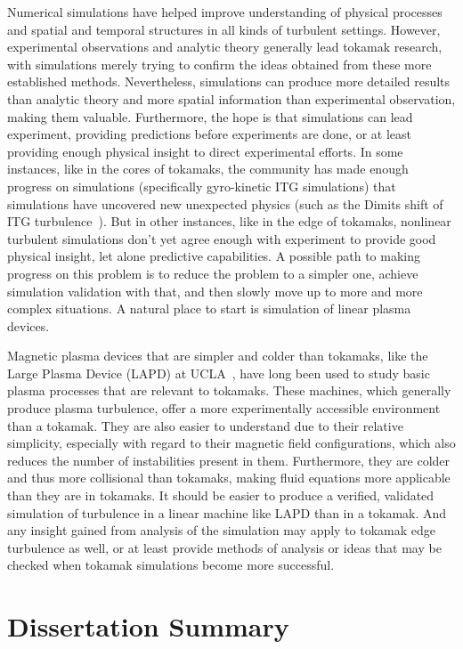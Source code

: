 Numerical simulations have helped improve understanding of physical processes and spatial and temporal structures in all kinds of turbulent settings. However,
experimental observations and analytic theory generally lead tokamak research, with simulations merely trying to confirm the ideas obtained from these more established methods.
Nevertheless, simulations can produce more detailed results than analytic theory and more spatial information than experimental observation, making them valuable.
Furthermore, the hope is that simulations can lead experiment, providing predictions before experiments are done, or at least providing enough physical insight to direct experimental efforts.
In some instances, like in the cores of tokamaks, the community has made enough progress on simulations (specifically gyro-kinetic ITG simulations) that simulations have uncovered new
unexpected physics (such as the Dimits shift of ITG turbulence~\cite{dimits2000}). But in other instances, like in the edge of tokamaks, nonlinear turbulent simulations don't yet
agree enough with experiment to provide good physical insight, let alone predictive capabilities. A possible path to making progress on this problem is to reduce the problem
to a simpler one, achieve simulation validation with that, and then slowly move up to more and more complex situations. A natural place to start is simulation of linear plasma devices.

Magnetic plasma devices that are simpler and colder than tokamaks, like the Large Plasma Device (LAPD) at UCLA~\cite{Gekelman1991}, have long been used to study basic plasma processes that
are relevant to tokamaks. These machines, which generally produce plasma turbulence, offer a more experimentally accessible environment than a tokamak. They are also easier to
understand due to their relative simplicity, especially with regard to their magnetic field configurations, which also reduces the number of instabilities present in them. 
Furthermore, they are colder and thus more collisional than tokamaks, making fluid equations more applicable than they are in tokamaks. It should be easier to produce a verified, validated
simulation of turbulence in a linear machine like LAPD than in a tokamak. And any insight gained from analysis of the simulation may apply to tokamak edge turbulence as well, or at least
provide methods of analysis or ideas that may be checked when tokamak simulations become more successful.

\section{Dissertation Summary}
\label{s_summary}


